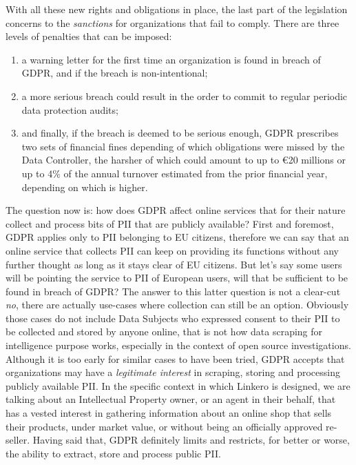 With all these new rights and obligations in place, the last part of the
legislation concerns to the \emph{sanctions} for organizations that fail to
comply. There are three levels of penalties that can be imposed:
\begin{enumerate}
  \item a warning letter for the first time an organization is found in breach
  of GDPR, and if the breach is non-intentional;
  \item a more serious breach could result in the order to commit to regular
  periodic data protection audits;
  \item and finally, if the breach is deemed to be serious enough, GDPR
  prescribes two sets of financial fines depending of which obligations were
  missed by the Data Controller, the harsher of which could amount to up to
  \euro20 millions or up to 4\% of the annual turnover estimated from the prior
  financial year, depending on which is higher.
\end{enumerate}

The question now is: how does GDPR affect online services that for their
nature collect and process bits of PII that are publicly available? First and
foremost, GDPR applies only to PII belonging to EU citizens, therefore we can say
that an online service that collects PII can keep on providing its functions
without any further thought as long as it stays clear of EU citizens. But let's
say some users will be pointing the service to PII of European users, will that
be sufficient to be found in breach of GDPR? The answer to this latter question
is not a clear-cut \emph{no}, there are actually use-cases where collection can
still be an option. Obviously those cases do not include Data Subjects
who expressed consent to their PII to be collected and stored by anyone online,
that is not how data scraping for intelligence purpose works, especially in the
context of open source investigations. Although it is too early for similar
cases to have been tried, GDPR accepts that organizations may have a
\emph{legitimate interest} in scraping, storing and processing publicly
available PII. In the specific context in which Linkero is designed, we are
talking about an Intellectual Property owner, or an agent in their behalf, that
has a vested interest in gathering information about an online shop that sells
their products, under market value, or without being an officially approved
re-seller. Having said that, GDPR definitely limits and restricts, for better or
worse, the ability to extract, store and process public PII.

